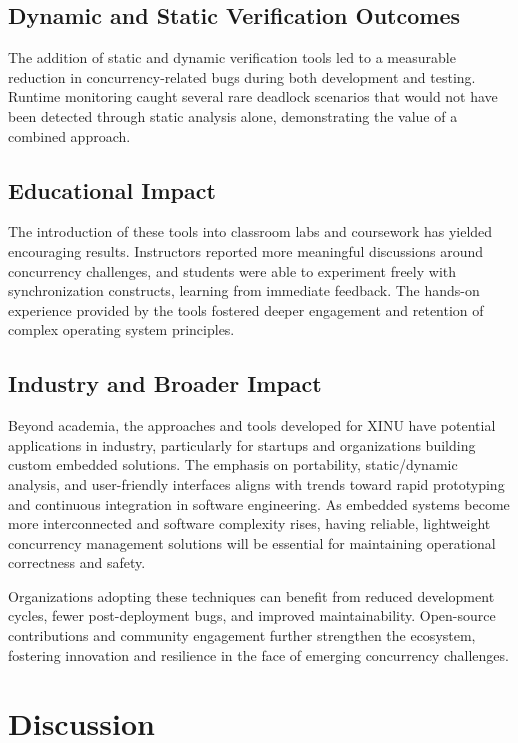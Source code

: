 \documentclass[conference,a4paper]{IEEEtran}
\begin{document}
\subsection{Dynamic and Static Verification Outcomes}

The addition of static and dynamic verification tools led to a measurable reduction in concurrency-related bugs during both development and testing. Runtime monitoring caught several rare deadlock scenarios that would not have been detected through static analysis alone, demonstrating the value of a combined approach.

\subsection{Educational Impact}

The introduction of these tools into classroom labs and coursework has yielded encouraging results. Instructors reported more meaningful discussions around concurrency challenges, and students were able to experiment freely with synchronization constructs, learning from immediate feedback. The hands-on experience provided by the tools fostered deeper engagement and retention of complex operating system principles.

\subsection{Industry and Broader Impact}

Beyond academia, the approaches and tools developed for XINU have potential applications in industry, particularly for startups and organizations building custom embedded solutions. The emphasis on portability, static/dynamic analysis, and user-friendly interfaces aligns with trends toward rapid prototyping and continuous integration in software engineering. As embedded systems become more interconnected and software complexity rises, having reliable, lightweight concurrency management solutions will be essential for maintaining operational correctness and safety.

Organizations adopting these techniques can benefit from reduced development cycles, fewer post-deployment bugs, and improved maintainability. Open-source contributions and community engagement further strengthen the ecosystem, fostering innovation and resilience in the face of emerging concurrency challenges.

\section{Discussion}
\end{document}
